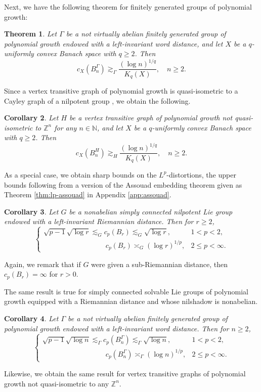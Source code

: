 \documentclass[11pt,reqno]{amsart}
\newtheorem{theorem}{Theorem}
\newtheorem{corollary}[theorem]{Corollary}
\newcommand{\1}{\mathbf 1}
\begin{document}
Next, we have the following theorem for finitely generated groups of polynomial growth:
\begin{theorem}\label{mainthm:polygrowthdistortion}
Let $\Gamma$ be a not virtually abelian finitely generated group of polynomial growth endowed with a left-invariant word distance, and let $X$ be a $q$-uniformly convex Banach space with $q\ge 2$. Then
\[
c_X\left(B^\Gamma_n\right)\gtrsim_\Gamma \frac{\left(\log n\right)^{1/q}}{K_q\left(X\right)},\quad n\ge 2.
\]
\end{theorem}
Since a vertex transitive graph of polynomial growth is quasi-isometric to a Cayley graph of a nilpotent group \cite{godsil1989note,trofimov1985graphs}, we obtain the following.
\begin{corollary}
	Let $H$ be a vertex transitive graph of polynomial growth not quasi-isometric to $\mathbb{Z}^n$ for any $n\in \mathbb{N}$, and let $X$ be a $q$-uniformly convex Banach space with $q\ge 2$. Then
	\[
	c_X\left(B^H_n\right)\gtrsim_H \frac{\left(\log n\right)^{1/q}}{K_q\left(X\right)},\quad n\ge 2.
	\]
\end{corollary}


As a special case, we obtain sharp bounds on the $L^p$-distortions, the upper bounds following from a version of the Assouad embedding theorem \cite{assouad1983plongements} given as Theorem \ref{thm:lp-assouad} in Appendix \ref{app:assouad}.

\begin{corollary}\label{cor:nilpotentlp}
Let $G$ be a nonabelian simply connected nilpotent Lie group endowed with a left-invariant Riemannian distance. Then for $r\ge 2$,
\[
\begin{cases}
\sqrt{p-1}\sqrt{\log r}\lesssim_G c_p\left(B_r\right)\lesssim_{G} \sqrt{\log r},& 1<p<2,\\
 \phantom{\sqrt{p-1}\sqrt{\log r}\lesssim_G~ } c_p\left(B_r\right)\asymp_{G} \left(\log r\right)^{1/p},& 2\le p<\infty.
\end{cases}
\]
\end{corollary}
Again, we remark that if $G$ were given a sub-Riemannian distance, then $c_p\left(B_r\right)=\infty$ for $r>0$.

The same result is true for simply connected solvable Lie groups of polynomial growth equipped with a Riemannian distance and whose nilshadow is nonabelian.



\begin{corollary}\label{cor:polygrowthlp}
Let $\Gamma$ be a not virtually abelian finitely generated group of polynomial growth endowed with a left-invariant word distance. Then for $n\ge 2$,
\[
\begin{cases}
\sqrt{p-1}\sqrt{\log n}\lesssim_\Gamma c_p\left(B^\Gamma_n\right)\lesssim_{\Gamma} \sqrt{\log n},& 1<p<2,\\
 \phantom{\sqrt{p-1}\sqrt{\log n}\lesssim_G~ } c_p\left(B^\Gamma_n\right)\asymp_{\Gamma} \left(\log n\right)^{1/p},& 2\le p<\infty.
\end{cases}
\]
\end{corollary}
Likewise, we obtain the same result for vertex transitive graphs of polynomial growth not quasi-isometric to any $\mathbb{Z}^n$.
\end{document}
